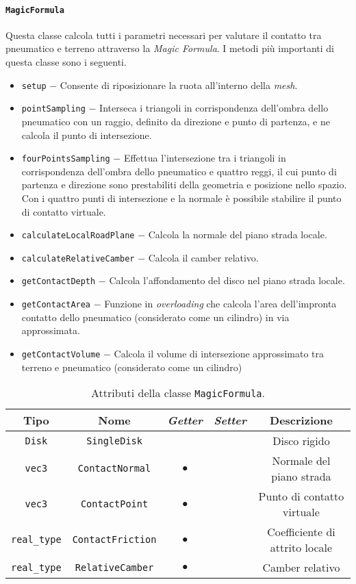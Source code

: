 \paragraph{\texttt{MagicFormula}}
Questa classe calcola tutti i parametri necessari per valutare il contatto tra pneumatico e terreno attraverso la \textit{Magic Formula}. I metodi più importanti di questa classe sono i seguenti.
\begin{itemize}
	\item \texttt{setup} $-$ Consente di riposizionare la ruota all'interno della \textit{mesh}.
	\item \texttt{pointSampling} $-$ Interseca i triangoli in corrispondenza dell'ombra dello pneumatico con un raggio, definito da direzione e punto di partenza, e ne calcola il punto di intersezione.
	\item \texttt{fourPointsSampling} $-$ Effettua l'intersezione tra i triangoli in corrispondenza dell'ombra dello pneumatico e quattro reggi, il cui punto di partenza e direzione sono prestabiliti della geometria e posizione nello spazio. Con i quattro punti di intersezione e la normale è possibile stabilire il punto di contatto virtuale.
	\item \texttt{calculateLocalRoadPlane} $-$ Calcola la normale del piano strada locale.
	\item \texttt{calculateRelativeCamber} $-$ Calcola il camber relativo.
	\item \texttt{getContactDepth} $-$ Calcola l'affondamento del disco nel piano strada locale.
	\item \texttt{getContactArea} $-$ Funzione in \textit{overloading} che calcola l'area dell'impronta contatto dello pneumatico (considerato come un cilindro) in via approssimata.
	\item \texttt{getContactVolume} $-$ Calcola il volume di intersezione approssimato tra terreno e pneumatico (considerato come un cilindro)
\end{itemize}
\begin{table}[h!]
	\centering
	\begin{tabular}{|c|c|c|c|c|}
		\hline 
		\textbf{Tipo} & \textbf{Nome} & \textit{\textbf{Getter}} & \textit{\textbf{Setter}} & \textbf{Descrizione} \\ \hline 
		\texttt{Disk} & \texttt{SingleDisk} &  &  & Disco rigido \\ \hline 
		\texttt{vec3} & \texttt{ContactNormal} & $\bullet$ &  & Normale del piano strada \\ \hline
		\texttt{vec3} & \texttt{ContactPoint} & $\bullet$ &  & Punto di contatto virtuale \\ \hline
		\texttt{real\_type} & \texttt{ContactFriction} & $\bullet$ &  & Coefficiente di attrito locale \\ \hline
		\texttt{real\_type} & \texttt{RelativeCamber} & $\bullet$ &  & Camber relativo \\ \hline
	\end{tabular}
	\caption{Attributi della classe \texttt{MagicFormula}.}
	\label{}
\end{table}
%
